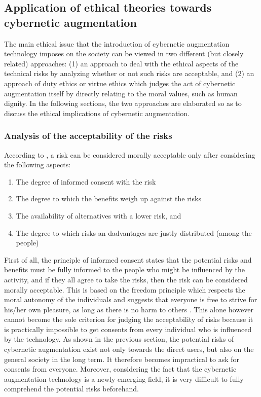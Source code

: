 \subsection{Application of ethical theories towards cybernetic augmentation}
The main ethical issue that the introduction of cybernetic augmentation technology imposes on the society can be viewed in two different (but closely related) approaches: (1) an approach to deal with the ethical aspects of the technical risks by analyzing whether or not such risks are acceptable, and (2) an approach of duty ethics or virtue ethics which judges the act of cybernetic augmentation itself by directly relating to the moral values, such as human dignity. In the following sections, the two approaches are elaborated so as to discuss the ethical implications of cybernetic augmentation.

\subsubsection{Analysis of the acceptability of the risks}
According to \cite{Ethics_textbook}, a risk can be considered morally acceptable only after considering the following aspects:
\begin{enumerate}
	\item The degree of informed consent with the risk
	\item The degree to which the benefits weigh up against the risks
	\item The availability of alternatives with a lower risk, and
	\item The degree to which risks an dadvantages are justly distributed (among the people)
\end{enumerate}

First of all, the principle of informed consent states that the potential risks and benefits must be fully informed to the people who might be influenced by the activity, and if they all agree to take the risks, then the risk can be considered morally acceptable. This is based on the freedom principle which respects the moral autonomy of the individuals and suggests that everyone is free to strive for his/her own pleasure, as long as there is no harm to others \cite{Ethics_textbook}. This alone however cannot become the sole criterion for judging the acceptability of risks because it is practically impossible to get consents from every individual who is influenced by the technology. As shown in the previous section, the potential risks of cybernetic augmentation exist not only towards the direct users, but also on the general society in the long term. It therefore becomes impractical to ask for consents from everyone. Moreover, considering the fact that the cybernetic augmentation technology is a newly emerging field, it is very difficult to fully comprehend the potential risks beforehand. 

